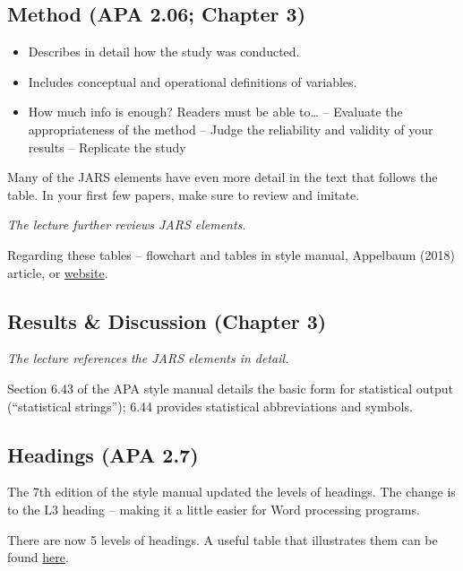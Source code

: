 \documentclass[
  english,
]{book}
\providecommand{\tightlist}{%
  \setlength{\itemsep}{0pt}\setlength{\parskip}{0pt}}
\begin{document}
\hypertarget{method-apa-2.06-chapter-3}{%
\subsection{Method (APA 2.06; Chapter 3)}\label{method-apa-2.06-chapter-3}}

\begin{itemize}
\tightlist
\item
  Describes in detail how the study was conducted.
\item
  Includes conceptual and operational definitions of variables.
\item
  How much info is enough? Readers must be able to\ldots{}
  -- Evaluate the appropriateness of the method
  -- Judge the reliability and validity of your results
  -- Replicate the study
\end{itemize}

Many of the JARS elements have even more detail in the text that follows the table. In your first few papers, make sure to review and imitate.

\emph{The lecture further reviews JARS elements.}

Regarding these tables -- flowchart and tables in style manual, Appelbaum (2018) article, or \href{https://apastyle.apa.org/jars/jars-quant-decision-flowchart.pdf}{website}.

\hypertarget{results-discussion-chapter-3}{%
\subsection{Results \& Discussion (Chapter 3)}\label{results-discussion-chapter-3}}

\emph{The lecture references the JARS elements in detail.}

Section 6.43 of the APA style manual details the basic form for statistical output (``statistical strings''); 6.44 provides statistical abbreviations and symbols.

\hypertarget{headings-apa-2.7}{%
\subsection{Headings (APA 2.7)}\label{headings-apa-2.7}}

The 7th edition of the style manual updated the levels of headings. The change is to the L3 heading -- making it a little easier for Word processing programs.

There are now 5 levels of headings. A useful table that illustrates them can be found \href{https://apastyle.apa.org/style-grammar-guidelines/paper-format/headings}{here}.
\end{document}
